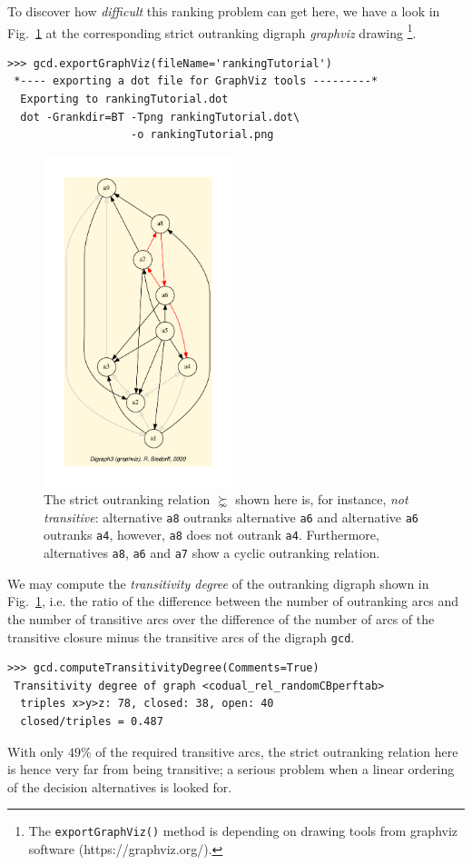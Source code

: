 To discover how \emph{difficult} this ranking problem can get here, we have a look in Fig.~\ref{fig:8.1} at the corresponding strict outranking digraph \emph{graphviz} drawing \footnote{ The \texttt{exportGraphViz()} method is depending on drawing tools from graphviz software (https://graphviz.org/).}.
\begin{lstlisting}
>>> gcd.exportGraphViz(fileName='rankingTutorial')
 *---- exporting a dot file for GraphViz tools ---------*
  Exporting to rankingTutorial.dot
  dot -Grankdir=BT -Tpng rankingTutorial.dot\
                   -o rankingTutorial.png
\end{lstlisting}
\begin{figure}[h]
\sidecaption[t]
\includegraphics[width=5.5cm]{Figures/rankingTutorial.pdf}
\caption{The strict outranking relation $\succnsim$ shown here is, for instance, \emph{not transitive}: alternative \texttt{a8} outranks alternative \texttt{a6} and alternative \texttt{a6} outranks \texttt{a4}, however, \texttt{a8} does not outrank \texttt{a4}. Furthermore, alternatives \texttt{a8}, \texttt{a6} and \texttt{a7} show a cyclic outranking relation. }
\label{fig:8.1}       %
\end{figure}

We may compute the \emph{transitivity degree} of the outranking digraph shown in Fig.~\ref{fig:8.1}, i.e. the ratio of the difference between the number of outranking arcs and the number of transitive arcs over the difference of the number of arcs of the transitive closure minus the transitive arcs of the digraph \texttt{gcd}.
\begin{lstlisting}
>>> gcd.computeTransitivityDegree(Comments=True)
 Transitivity degree of graph <codual_rel_randomCBperftab>
  triples x>y>z: 78, closed: 38, open: 40
  closed/triples = 0.487
\end{lstlisting}    
With only $49\%$ of the required transitive arcs, the strict outranking relation here is hence very far from being transitive; a serious problem when a linear ordering of the decision alternatives is looked for.

